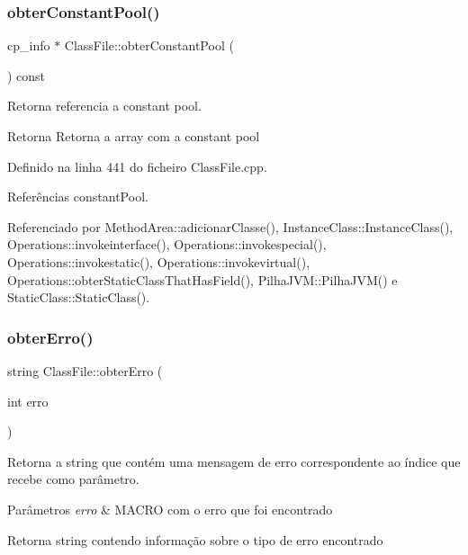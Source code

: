 \subsubsection{\texorpdfstring{obter\+Constant\+Pool()}{obterConstantPool()}}
{\footnotesize\ttfamily cp\+\_\+info $\ast$ Class\+File\+::obter\+Constant\+Pool (\begin{DoxyParamCaption}{ }\end{DoxyParamCaption}) const}



Retorna referencia a constant pool. 

\begin{DoxyReturn}{Retorna}
Retorna a array com a constant pool 
\end{DoxyReturn}


Definido na linha 441 do ficheiro Class\+File.\+cpp.



Referências constant\+Pool.



Referenciado por Method\+Area\+::adicionar\+Classe(), Instance\+Class\+::\+Instance\+Class(), Operations\+::invokeinterface(), Operations\+::invokespecial(), Operations\+::invokestatic(), Operations\+::invokevirtual(), Operations\+::obter\+Static\+Class\+That\+Has\+Field(), Pilha\+J\+V\+M\+::\+Pilha\+J\+V\+M() e Static\+Class\+::\+Static\+Class().

\mbox{\label{classClassFile_a32767b8d966ef87249aa3a41ec5d67c3}} 
\subsubsection{\texorpdfstring{obter\+Erro()}{obterErro()}}
{\footnotesize\ttfamily string Class\+File\+::obter\+Erro (\begin{DoxyParamCaption}\item[{int}]{erro }\end{DoxyParamCaption})\hspace{0.3cm}{\ttfamily [private]}}



Retorna a string que contém uma mensagem de erro correspondente ao índice que recebe como parâmetro. 


\begin{DoxyParams}{Parâmetros}
{\em erro} & M\+A\+C\+RO com o erro que foi encontrado \\
\hline
\end{DoxyParams}
\begin{DoxyReturn}{Retorna}
string contendo informação sobre o tipo de erro encontrado 
\end{DoxyReturn}


